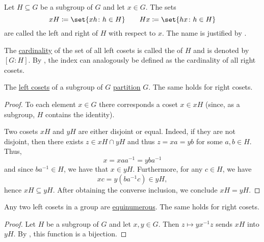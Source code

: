 \begin{definition}\label{def:group_cosets}
  Let \( H \subseteq G \) be a subgroup of \( G \) and let \( x \in G \). The sets
  \begin{equation*}
    x H \coloneqq \set{ xh \colon h \in H }
    \quad\quad
    H x \coloneqq \set{ hx \colon h \in H }
  \end{equation*}
  are called the left and right  of \( H \) with respect to \( x \). The name is justified by .

  The \hyperref[def:cardinal]{cardinality} of the set of all left cosets is called the  of \( H \) and is denoted by \( [G : H] \). By , the index can analogously be defined as the cardinality of all right cosets.
\end{definition}

\begin{lemma}\label{thm:group_coset_partition}
  The \hyperref[def:group_cosets]{left cosets} of a subgroup of \( G \) \hyperref[def:set_partition]{partition} \( G \). The same holds for right cosets.
\end{lemma}
\begin{proof}
  To each element \( x \in G \) there corresponds a coset \( x \in xH \) (since, as a subgroup, \( H \) contains the identity).

  Two cosets \( xH \) and \( yH \) are either disjoint or equal. Indeed, if they are not disjoint, then there exists \( z \in xH \cap yH \) and thus \( z = xa = yb \) for some \( a, b \in H \). Thus,
  \begin{equation*}
    x = x a a^{-1} = y b a^{-1}
  \end{equation*}
  and since \( b a^{-1} \in H \), we have that \( x \in yH \). Furthermore, for any \( c \in H \), we have
  \begin{equation*}
    xc = y(b a^{-1} c) \in yH,
  \end{equation*}
  hence \( xH \subseteq yH \). After obtaining the converse inclusion, we conclude \( xH = yH \).
\end{proof}

\begin{lemma}\label{thm:group_coset_bijection}
  Any two left cosets in a group are \hyperref[def:equinumerosity]{equinumerous}. The same holds for right cosets.
\end{lemma}
\begin{proof}
  Let \( H \) be a subgroup of \( G \) and let \( x, y \in G \). Then \( z \mapsto y x^{-1} z \) sends \( xH \) into \( yH \). By , this function is a bijection.
\end{proof}


